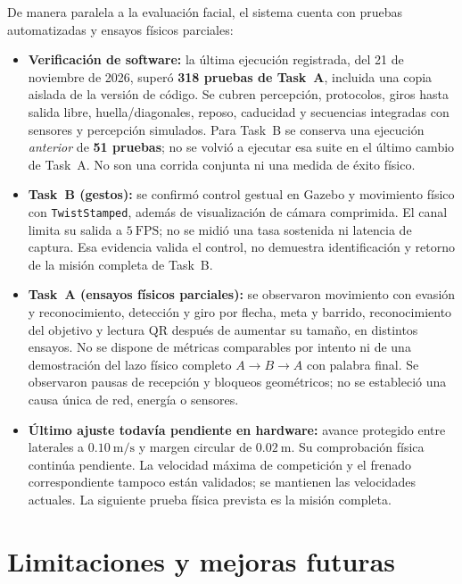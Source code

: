 \documentclass[11pt,a4paper]{article}
\begin{document}
De manera paralela a la evaluación facial, el sistema cuenta con pruebas
automatizadas y ensayos físicos parciales:
\begin{itemize}
  \item \textbf{Verificación de software:} la última ejecución registrada,
  del 21 de noviembre de 2026, superó \textbf{318 pruebas de Task~A}, incluida
  una copia aislada de la versión de código. Se cubren percepción,
  protocolos, giros hasta salida libre, huella/diagonales, reposo, caducidad y
  secuencias integradas con sensores y percepción simulados. Para Task~B se
  conserva una ejecución \emph{anterior} de \textbf{51 pruebas}; no se volvió a
  ejecutar esa suite en el último cambio de Task~A. No son una corrida conjunta
  ni una medida de éxito físico.
  \item \textbf{Task~B (gestos):} se confirmó control gestual en Gazebo y
  movimiento físico con \texttt{TwistStamped}, además de visualización de cámara
  comprimida. El canal limita su salida a $5\ \mathrm{FPS}$; no se midió una
  tasa sostenida ni latencia de captura. Esa evidencia valida el control, no
  demuestra identificación y retorno de la misión completa de Task~B.
  \item \textbf{Task~A (ensayos físicos parciales):} se observaron
  movimiento con evasión y reconocimiento, detección y giro por flecha, meta y
  barrido, reconocimiento del objetivo y lectura QR después de aumentar su
  tamaño, en distintos ensayos. No se dispone de métricas comparables por
  intento ni de una demostración del lazo físico completo $A\to B\to A$ con
  palabra final. Se observaron pausas de recepción y bloqueos geométricos;
  no se estableció una causa única de red, energía o sensores.
  \item \textbf{Último ajuste todavía pendiente en hardware:} avance protegido
  entre laterales a $0.10\ \mathrm{m/s}$ y margen circular de $0.02\ \mathrm{m}$.
  Su comprobación física continúa pendiente. La velocidad máxima de competición y el
  frenado correspondiente tampoco están validados; se mantienen las
  velocidades actuales. La siguiente prueba física prevista es la misión completa.

\end{itemize}



\section{Limitaciones y mejoras futuras}
\end{document}
